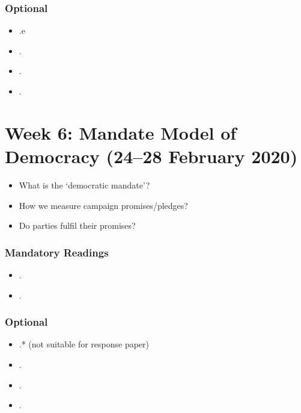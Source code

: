 \documentclass[abstract=on,parskip=full,headings=standardclasses,fontsize=11pt,paper=a4]{scrartcl}
\begin{document}
\subsubsection*{Optional}
\begin{itemize}
\item {}.e
\item {}.
\item {}.
\item {}.
\end{itemize}






\section{Week 6:  Mandate Model of Democracy (24--28 February 2020)}


\begin{itemize}
\renewcommand\labelitemi{--}
\item What is the `democratic mandate'? 
\item How we measure campaign promises/pledges?
\item Do parties fulfil their promises?
\end{itemize}

\subsubsection*{Mandatory Readings}
\begin{itemize}
\item {}.
\item {}.
\end{itemize}

\subsubsection*{Optional}
\begin{itemize}
\item {}.* (not suitable for response paper)
\item {}.
\item {}.
\item {}.
\end{itemize}
\end{document}
